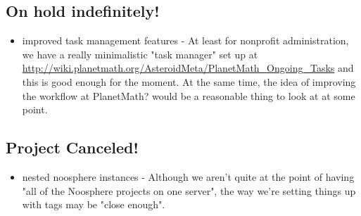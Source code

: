 \subsection*{On hold indefinitely!}

\begin{itemize}
\item improved task management features - At least for nonprofit administration, we have a really minimalistic "task manager" set up at \url{http://wiki.planetmath.org/AsteroidMeta/PlanetMath_Ongoing_Tasks} and this is good enough for the moment. At the same time, the idea of improving the workflow at PlanetMath? would be a reasonable thing to look at at some point.
\end{itemize}

\subsection*{Project Canceled!}

\begin{itemize}
\item nested noosphere instances - Although we aren't quite at the point of having "all of the Noosphere projects on one server", the way we're setting things up with tags may be "close enough". 
\end{itemize}
